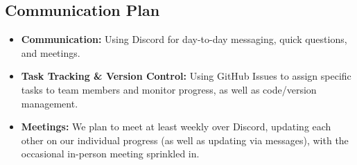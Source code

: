 \documentclass[11pt]{extarticle}
\begin{document}
\subsection{Communication Plan}
\begin{itemize}
    \item \textbf{Communication:} Using Discord for day-to-day messaging, quick questions, and meetings.
    \item \textbf{Task Tracking \& Version Control:} Using GitHub Issues to assign specific tasks to team members and monitor progress, as well as code/version management.
    \item \textbf{Meetings:} We plan to meet at least weekly over Discord, updating each other on our individual progress (as well as updating via messages), with the occasional in-person meeting sprinkled in.
\end{itemize}

\newpage


\end{document}

